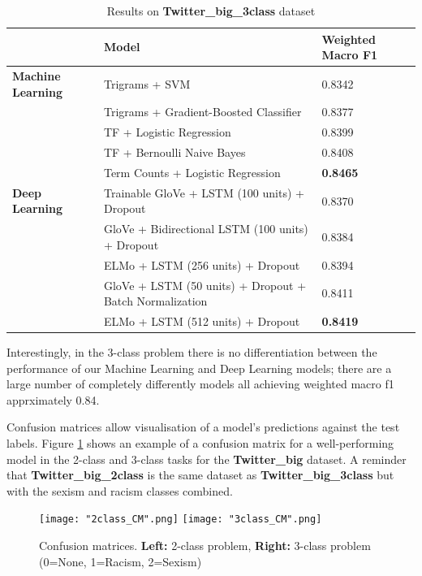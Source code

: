 \documentclass[12pt,a4paper]{article}
\begin{document}
\begin{table}[H]
	\centering
	\vspace*{-18pt}
	\caption{Results on \textbf{Twitter\_big\_3class} dataset}
	\label{results4}
	\hspace*{-1.5cm}
	\begin{tabular}{p{3.4cm} p{10.5cm} p{3.8cm}} \hline\hline
		& \textbf{Model} & \textbf{Weighted Macro F1}  \\ \hline
		
     \textbf{Machine Learning} & Trigrams + SVM & 0.8342 \\
	& Trigrams + Gradient-Boosted Classifier & 0.8377 \\
	& TF + Logistic Regression & 0.8399 \\
	& TF + Bernoulli Naive Bayes & 0.8408 \\
	& Term Counts + Logistic Regression & \textbf{0.8465} \\ \hline
	
	\textbf{Deep Learning} & Trainable GloVe + LSTM (100 units) + Dropout & 0.8370  \\  
	& GloVe + Bidirectional LSTM (100 units) + Dropout & 0.8384  \\
	& ELMo + LSTM (256 units) + Dropout & 0.8394  \\
	& GloVe + LSTM (50 units) + Dropout + Batch Normalization & 0.8411 \\ 
	& ELMo + LSTM (512 units) + Dropout & \textbf{0.8419} \\ \hline
	\end{tabular}
\end{table}

Interestingly, in the 3-class problem there is no differentiation between the performance of our Machine Learning and Deep Learning models; there are a large number of completely differently models all achieving weighted macro f1 apprximately 0.84.

Confusion matrices allow visualisation of a model's predictions against the test labels. Figure \ref{CM:CM2} shows an example of a confusion matrix for a well-performing model in the 2-class and 3-class tasks for the \textbf{Twitter\_big} dataset. A reminder that \textbf{Twitter\_big\_2class} is the same dataset as \textbf{Twitter\_big\_3class} but with the sexism and racism classes combined.

\begin{figure}[H]
	\centering
	\texttt{[image: "2class\_CM".png]} 
	\hspace*{0.05\textwidth}
	\texttt{[image: "3class\_CM".png]}
	\vspace*{-0.5cm}

	\caption{Confusion matrices. \newline\textbf{Left:} 2-class problem, \textbf{Right:} 3-class problem (0=None, 1=Racism, 2=Sexism)}
	\label{CM:CM2}
\end{figure}
\end{document}

